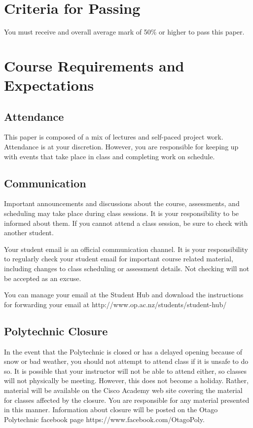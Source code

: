 \documentclass{article}
\begin{document}
\section*{Criteria for Passing}
You must receive and overall average mark of 50\% or higher to pass this paper.

\section*{Course Requirements and Expectations}
\subsection*{Attendance}
This paper is composed of a mix of lectures and self-paced project work.  Attendance is at your discretion. 
However, you are responsible for keeping up with events that take place in class and completing work on schedule. 

\subsection*{Communication}
Important announcements and discussions about the course, assessments, and scheduling may take place during class sessions.  It is your responsibility to be informed about them.  If you cannot attend a class session, be sure to check with another student.


Your student email is an official communication channel. It is your responsibility to regularly check your student email for important course related material, including changes to class scheduling or assessment details. Not checking will not be accepted as an excuse.

You can manage your email at the Student Hub and download the instructions for forwarding your email at http://www.op.ac.nz/students/student-hub/

\subsection*{Polytechnic Closure}
In the event that the Polytechnic is closed or has a delayed opening because of snow or bad weather, you should not attempt to attend class if it is unsafe to do so. It is possible that your instructor will not be able to attend either, so classes will not physically be meeting. However, this does not become a holiday. Rather, material will be available on the Cisco Academy web site covering the material for classes affected by the closure. You are responsible for any material presented in this manner. Information about closure will be posted on the Otago Polytechnic facebook page https://www.facebook.com/OtagoPoly.
\end{document}
